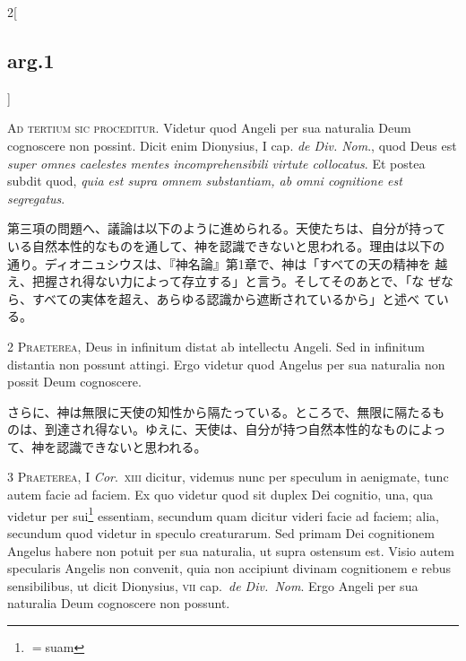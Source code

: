 \documentclass[paper=a4paper,fontsize=10pt,jafontsize=9pt,titlepage]{jlreq}
\begin{document}
\begin{paracol}{2}[\subsection{arg.1}]

{\huge A}{\scshape d tertium sic proceditur}. Videtur quod Angeli per
sua naturalia Deum cognoscere non possint. Dicit enim Dionysius, I
cap. {\itshape de Div. Nom}., quod Deus est {\itshape super omnes
caelestes mentes incomprehensibili virtute collocatus}. Et postea
subdit quod, {\itshape quia est supra omnem substantiam, ab omni
cognitione est segregatus}.

\switchcolumn

第三項の問題へ、議論は以下のように進められる。天使たちは、自分が持って
いる自然本性的なものを通して、神を認識できないと思われる。理由は以下の
通り。ディオニュシウスは、『神名論』第1章で、神は「すべての天の精神を
越え、把握され得ない力によって存立する」と言う。そしてそのあとで、「な
ぜなら、すべての実体を超え、あらゆる認識から遮断されているから」と述べ
ている。


{\scshape 2 Praeterea}, Deus in infinitum distat ab intellectu
Angeli. Sed in infinitum distantia non possunt attingi. Ergo videtur
quod Angelus per sua naturalia non possit Deum cognoscere.

\switchcolumn

さらに、神は無限に天使の知性から隔たっている。ところで、無限に隔たるも
のは、到達され得ない。ゆえに、天使は、自分が持つ自然本性的なものによっ
て、神を認識できないと思われる。


{\scshape 3 Praeterea}, I {\itshape Cor}.~{\scshape xiii} dicitur,
videmus nunc per speculum in aenigmate, tunc autem facie ad faciem. Ex
quo videtur quod sit duplex Dei cognitio, una, qua videtur per
sui\footnote{$=$suam} essentiam, secundum quam dicitur videri facie ad
faciem; alia, secundum quod videtur in speculo creaturarum. Sed primam
Dei cognitionem Angelus habere non potuit per sua naturalia, ut supra
ostensum est. Visio autem specularis Angelis non convenit, quia non
accipiunt divinam cognitionem e rebus sensibilibus, ut dicit
Dionysius, {\scshape vii} cap.~{\itshape de Div.~Nom}. Ergo Angeli per
sua naturalia Deum cognoscere non possunt.


\end{paracol}
\end{document}
